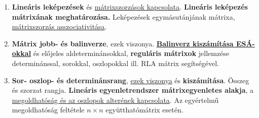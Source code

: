 \documentclass[10pt]{article}
\begin{document}
\begin{enumerate}
            \item \textbf{Lineáris leképezések} és \underline{mátrixszorzások kapcsolata}. \textbf{Lineáris leképezés mátrixának meghatározása.} Leképezések egymásutánjának mátrixa, \underline{mátrixszorzás asszociativitása}.
            \item \textbf{Mátrix jobb- és balinverze}, ezek viszonya. \textbf{\underline{Balinverz kiszámítása ESÁ-okkal}} és előjeles aldeterminánsokkal, \textbf{reguláris mátrixok} jellemzése determinánssal, sorokkal, oszlopokkal ill. RLA mátrix segítségével.
            \item \textbf{Sor- oszlop- és determinánsrang}, \underline{ezek viszonya} és \textbf{kiszámítása}. Összeg és szorzat rangja. \textbf{Lineáris egyenletrendszer mátrixegyenletes alakja}, a \underline{megoldhatóság és az oszlopok alterének kapcsolata}. Az egyértelmű megoldhatóság feltétele $n \times n$ együtthatómátrix esetén.
        \end{enumerate}

		
\end{document}

